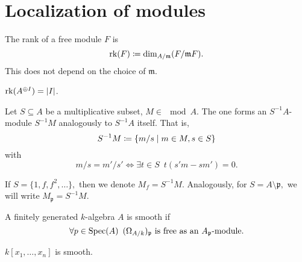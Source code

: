 \section{Localization of modules}

\begin{df}
  The rank of a free module $F$ is
  \[ \operatorname*{rk}(F) \coloneqq \dim_{A/{\mathfrak{m}}}(F / {\mathfrak m F}).\]
  This does not depend on the choice of $\mathfrak m$.
\end{df}

\begin{example}
  $ \operatorname*{rk}(A^{\oplus I}) = \lvert I\rvert$.
\end{example}

\begin{df}
  Let $S \subseteq A$ be a multiplicative subset, $M \in \mod{A}$. The one forms an $S^{-1}A$-module $S^{-1}M$ analogously to $S^{-1}A$ itself. That is,
  \[ S^{-1}M \coloneqq \{ m / {s} \mathrel{|} m \in M, s \in S\}\]
  with
  \[ m / {s} = m' / {s'} \iff \exists t \in S \enspace t(s'm - sm') = 0.\]
\end{df}

\begin{example}
  If
  \( S = \{1, f, f^2, \dotsc \},\)
  then we denote
  \( M_f = S^{-1}M.\)
  Analogously, for
  \( S = A \setminus \mathfrak p,\)
  we will write
  \(M_{\mathfrak p} = S^{-1}M.\)
\end{example}

\begin{df}
  A finitely generated $k$-algebra $A$ is smooth if
  \[ \forall p \in \text{Spec}(A) \enspace (\Omega_{A/{k}})_{\mathfrak p} \text{ is free as an $A_{\mathfrak p}$-module}.\]
\end{df}


\begin{example}
  $k[x_1, \dotsc, x_n]$ is smooth.
\end{example}

